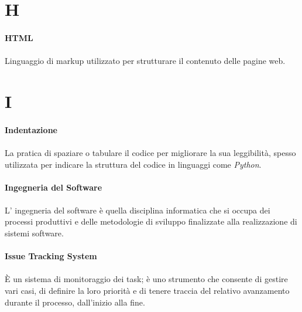 \documentclass[10pt, a4paper]{article}
\begin{document}
\newpage
\section{H}
\vspace{2em}
\paragraph{HTML}\noindent\hrulefill
\paragraph{}Linguaggio di markup utilizzato per strutturare il contenuto delle pagine web.


\newpage
\section{I}
\vspace{2em}
\paragraph{Indentazione}\noindent\hrulefill
\paragraph{}La pratica di spaziare o tabulare il codice per migliorare la sua leggibilità, spesso utilizzata per indicare la struttura del codice in linguaggi come \textit{Python\pg}.


\vspace{2em}
\paragraph{Ingegneria del Software}\noindent\hrulefill
\paragraph{}L' ingegneria del software è quella disciplina informatica che si occupa dei processi produttivi e delle metodologie di sviluppo finalizzate alla realizzazione di sistemi software.

\vspace{2em}
\paragraph{Issue Tracking System}\noindent\hrulefill
\paragraph{}È un sistema di monitoraggio dei task; è uno strumento che consente di gestire vari casi, di definire la loro priorità e di tenere traccia del relativo avanzamento durante il processo, dall'inizio alla fine. 
\end{document}
